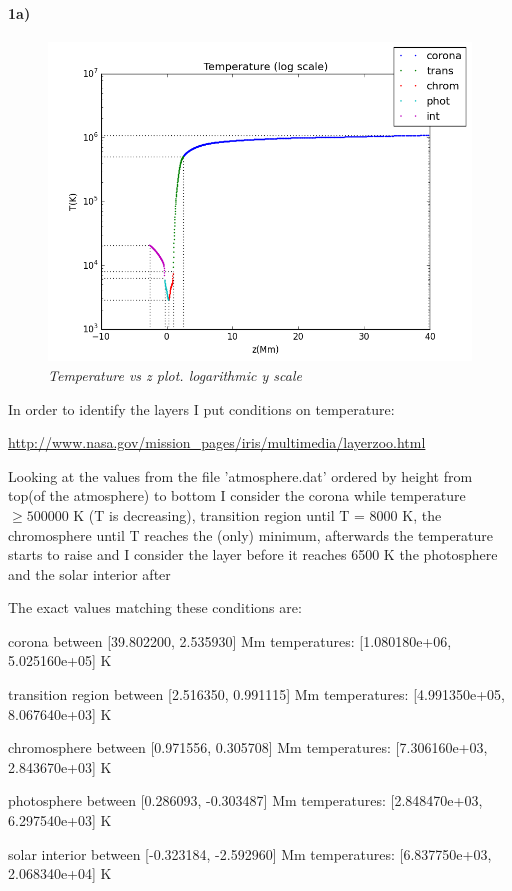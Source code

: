 \documentclass[10pt]{book}
\begin{document}
\paragraph {1a)} 
\begin{figure}[!ht]
 \centering
 \includegraphics[scale=0.5]{tempLayers.png}
 \caption{\emph{Temperature vs z plot. logarithmic y scale}}
\end{figure}

In order to identify the layers I put conditions on temperature:

\url{http://www.nasa.gov/mission_pages/iris/multimedia/layerzoo.html}

Looking at  the values from the  file 'atmosphere.dat' ordered by height from top(of the atmosphere) 
to bottom I consider the corona while temperature $\ge 500000$ K (T is decreasing), 
transition region until T = 8000 K, the chromosphere until T reaches the (only) minimum, afterwards the temperature starts to raise
and I consider the layer before it reaches 6500 K the photosphere and  the solar interior after

The exact values matching these conditions are: 
\begin{description}

\item corona between [39.802200, 2.535930] Mm temperatures: [1.080180e+06, 5.025160e+05] K 
\item transition region between [2.516350, 0.991115] Mm temperatures: [4.991350e+05, 8.067640e+03] K  
\item chromosphere between [0.971556, 0.305708] Mm temperatures: [7.306160e+03, 2.843670e+03] K 
\item photosphere between [0.286093, -0.303487] Mm temperatures: [2.848470e+03, 6.297540e+03] K 
\item solar interior between [-0.323184, -2.592960] Mm temperatures: [6.837750e+03, 2.068340e+04] K 

\end{description}
\end{document}

